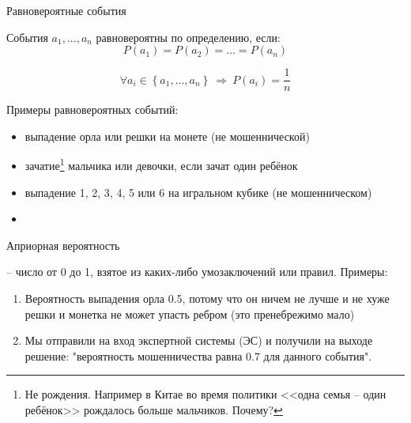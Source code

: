 \begin{frame}{Равновероятные события}
	\small
	
	События  $a_1, ..., a_n$ равновероятны по определению, если:
	\begin{equation}
	P(a_1) = P(a_2) = ... = P(a_n)
	\end{equation}
	
	\begin{equation}
	\forall a_i \in \left\{a_1, ..., a_n \right\} ~\Longrightarrow~ P(a_i) = \frac{1}{n}
	\end{equation}
	
	Примеры равновероятных событий:
	\begin{itemize}
		\item выпадение орла или решки на монете (не мошеннической)
		\item зачатие\footnote{Не рождения. Например в Китае во время политики <<одна семья -- один ребёнок>> рождалось больше мальчиков. Почему?} мальчика или девочки, если зачат один ребёнок
		\item выпадение 1, 2, 3, 4, 5 или 6 на игральном кубике (не мошенническом)
		\item {}
	\end{itemize}
	
\end{frame}


\begin{frame}{Априорная вероятность}
	
	 -- число от 0 до 1, взятое из каких-либо умозаключений или правил.
	Примеры:
	\begin{enumerate}
		\item Вероятность выпадения орла 0.5, потому что он ничем не лучше и не хуже решки и монетка не может упасть ребром (это пренебрежимо мало)
		\item Мы отправили  на вход экспертной системы (ЭС) и получили на выходе решение: "вероятность мошенничества равна 0.7 для данного события".
	\end{enumerate}
	
\end{frame}

